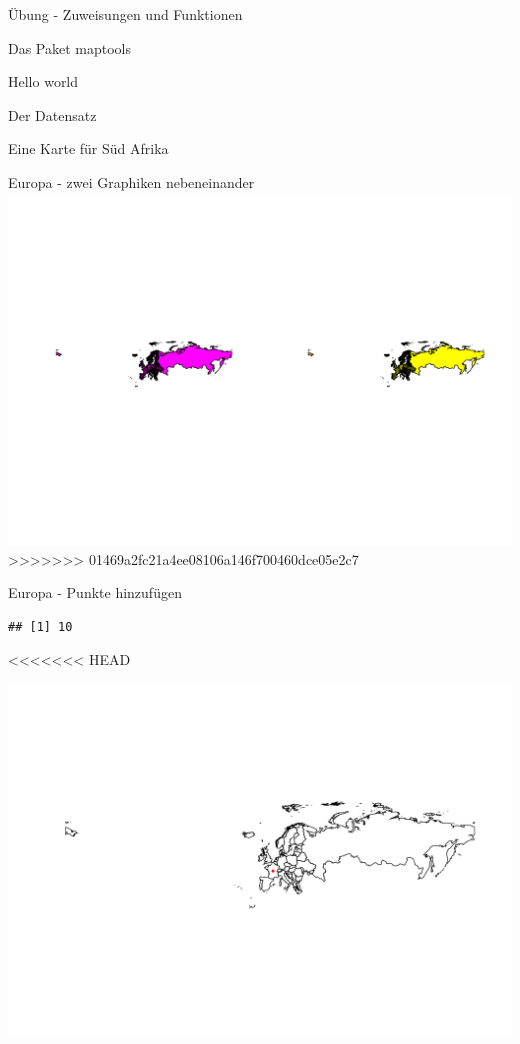 \documentclass[ignorenonframetext,]{beamer}
\newenvironment{Shaded}{\begin{snugshade}}{\end{snugshade}}
\newcommand{\DataTypeTok}[1]{\textcolor[rgb]{0.74,0.68,0.62}{\underline{#1}}}
\newcommand{\DecValTok}[1]{\textcolor[rgb]{0.27,0.67,0.26}{#1}}
\newcommand{\KeywordTok}[1]{\textcolor[rgb]{0.26,0.66,0.93}{\textbf{#1}}}
\newcommand{\NormalTok}[1]{\textcolor[rgb]{0.74,0.68,0.62}{#1}}
\newcommand{\OperatorTok}[1]{\textcolor[rgb]{0.74,0.68,0.62}{#1}}
\newcommand{\StringTok}[1]{\textcolor[rgb]{0.02,0.61,0.04}{#1}}
\begin{document}
\begin{frame}[fragile]{Übung - Zuweisungen und Funktionen}
\begin{frame}[fragile]{Das Paket maptools}
\begin{frame}[fragile]{Hello world}
\begin{frame}[fragile]{Der Datensatz}
\begin{frame}[fragile]{Eine Karte für Süd Afrika}
\begin{frame}{Europa - zwei Graphiken nebeneinander}
\includegraphics{Geomedizin_files/figure-beamer/unnamed-chunk-104-1.pdf}
>>>>>>> 01469a2fc21a4ee08106a146f700460dce05e2c7

\end{frame}

\begin{frame}[fragile]{Europa - Punkte hinzufügen}
\protect\hypertarget{europa---punkte-hinzufugen}{}

\begin{verbatim}
## [1] 10
\end{verbatim}

<<<<<<< HEAD
\begin{Shaded}
\end{Shaded}

\includegraphics{Geomedizin_files/figure-beamer/unnamed-chunk-84-1.pdf}


\end{frame}
\end{frame}
\end{frame}
\end{frame}
\end{frame}
\end{frame}
\end{document}
